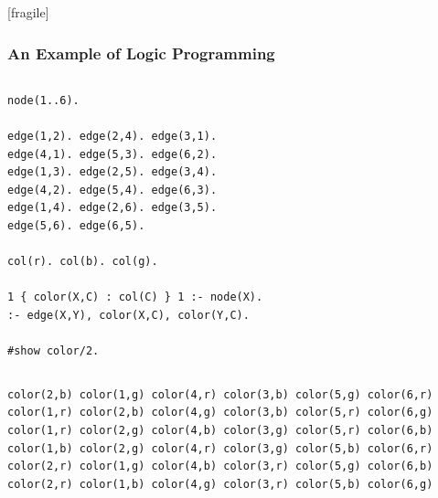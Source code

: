 \documentclass[bigger,xcolor={x11names,svgnames}]{beamer}
\begin{document}
\begin{frame}
    [fragile]
    \frametitle{An Example of Logic Programming}
    \begin{columns}[c]
        \scriptsize
        \begin{lstlisting} 
node(1..6).

edge(1,2). edge(2,4). edge(3,1).
edge(4,1). edge(5,3). edge(6,2).
edge(1,3). edge(2,5). edge(3,4).
edge(4,2). edge(5,4). edge(6,3).
edge(1,4). edge(2,6). edge(3,5).
edge(5,6). edge(6,5).

col(r). col(b). col(g).

1 { color(X,C) : col(C) } 1 :- node(X).
:- edge(X,Y), color(X,C), color(Y,C).

#show color/2.
        \end{lstlisting}
    \end{columns}
    \vfill
    \scriptsize
    \begin{lstlisting}    
color(2,b) color(1,g) color(4,r) color(3,b) color(5,g) color(6,r)
color(1,r) color(2,b) color(4,g) color(3,b) color(5,r) color(6,g)
color(1,r) color(2,g) color(4,b) color(3,g) color(5,r) color(6,b)
color(1,b) color(2,g) color(4,r) color(3,g) color(5,b) color(6,r)
color(2,r) color(1,g) color(4,b) color(3,r) color(5,g) color(6,b)
color(2,r) color(1,b) color(4,g) color(3,r) color(5,b) color(6,g)
    \end{lstlisting}
\end{frame}
\end{document}
